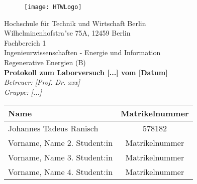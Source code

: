 \begin{titlepage}

		\begin{figure}[h] 
				\begin{flushright}
			\texttt{[image: HTWLogo]}\\
				\end{flushright}
		\end{figure}
		
	\begin{center}
		\vspace*{\fill}
		{\Large Hochschule f{\"u}r Technik und Wirtschaft Berlin}\\
			\bigskip
			Wilhelminenhofstra"se 75A, 12459 Berlin\\
			\bigskip
		Fachbereich 1 \\Ingenieurwissenschaften - Energie und Information\\Regenerative Energien (B)\\
		\vfill
		 \textcolor{HTWGreen}{\textbf{\Large{Protokoll zum Laborversuch [...] vom [Datum]}}}\\
		\textit{Betreuer: [Prof. Dr. xxx]}\\
		\textit{Gruppe: [...]}\\
	\vfill
	\end{center}
\vfill
\begin{table}[H]
			\centering
			\begin{tabular}{|l|c|}
			\hline
			\rowcolor[cmyk]{0.55, 0.00, 1.00, 0.00} \textbf{Name} & \textbf{Matrikelnummer}  \\
			\hline
			Johannes Tadeus Ranisch     & 578182\\
			\hline
			Vorname, Name  2. Student:in       & Matrikelnummer\\
			\hline
			Vorname, Name  3. Student:in       & Matrikelnummer\\
			\hline
			Vorname, Name  4. Student:in			 & Matrikelnummer\\
			\hline
			\end{tabular}
			\end{table}
\end{titlepage}
